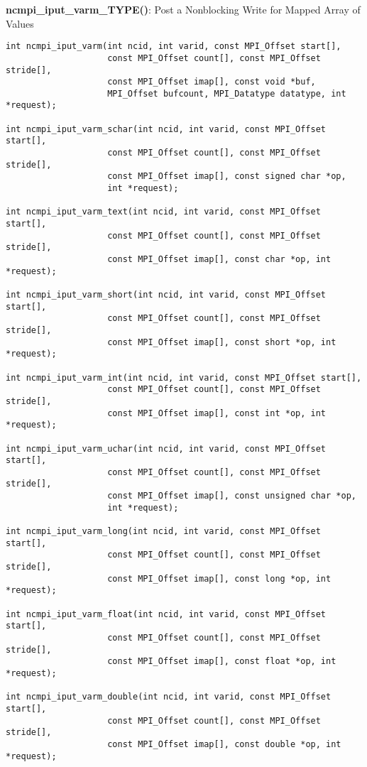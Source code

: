 {\bf ncmpi\_iput\_varm\_TYPE()}: Post a Nonblocking Write for Mapped Array of Values

\begin{verbatim}
int ncmpi_iput_varm(int ncid, int varid, const MPI_Offset start[],
                    const MPI_Offset count[], const MPI_Offset stride[],
                    const MPI_Offset imap[], const void *buf,
                    MPI_Offset bufcount, MPI_Datatype datatype, int *request); 

int ncmpi_iput_varm_schar(int ncid, int varid, const MPI_Offset start[],
                    const MPI_Offset count[], const MPI_Offset stride[],
                    const MPI_Offset imap[], const signed char *op,
                    int *request); 

int ncmpi_iput_varm_text(int ncid, int varid, const MPI_Offset start[],
                    const MPI_Offset count[], const MPI_Offset stride[],
                    const MPI_Offset imap[], const char *op, int *request); 

int ncmpi_iput_varm_short(int ncid, int varid, const MPI_Offset start[],
                    const MPI_Offset count[], const MPI_Offset stride[],
                    const MPI_Offset imap[], const short *op, int *request); 

int ncmpi_iput_varm_int(int ncid, int varid, const MPI_Offset start[],
                    const MPI_Offset count[], const MPI_Offset stride[],
                    const MPI_Offset imap[], const int *op, int *request); 

int ncmpi_iput_varm_uchar(int ncid, int varid, const MPI_Offset start[],
                    const MPI_Offset count[], const MPI_Offset stride[],
                    const MPI_Offset imap[], const unsigned char *op,
                    int *request);

int ncmpi_iput_varm_long(int ncid, int varid, const MPI_Offset start[],
                    const MPI_Offset count[], const MPI_Offset stride[],
                    const MPI_Offset imap[], const long *op, int *request);

int ncmpi_iput_varm_float(int ncid, int varid, const MPI_Offset start[],
                    const MPI_Offset count[], const MPI_Offset stride[],
                    const MPI_Offset imap[], const float *op, int *request); 

int ncmpi_iput_varm_double(int ncid, int varid, const MPI_Offset start[],
                    const MPI_Offset count[], const MPI_Offset stride[],
                    const MPI_Offset imap[], const double *op, int *request); 
\end{verbatim}


